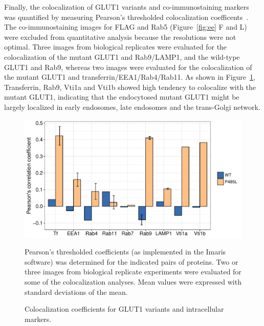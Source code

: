 Finally, the colocalization of GLUT1 variants and co-immunostaining markers was quantified by 
measuring Pearson's thresholded colocalization coefficents~\cite{Costes}. The co-immunostaining images for FLAG and Rab5 (Figure~\ref{fig:ee} F and L) were excluded from quantitative analysis because the resolutions were not optimal. Three images from biological replicates were evaluated for the colocalization of the mutant GLUT1 and Rab9/LAMP1, and the wild-type GLUT1 and Rab9, whereas two images were evaluated for the colocalization of the mutant GLUT1 and transferrin/EEA1/Rab4/Rab11. As shown in Figure~\ref{fig:coloc}, Transferrin, Rab9, Vti1a and Vti1b showed high tendency to colocalize with the mutant GLUT1, indicating that the endocytosed mutant GLUT1 might be largely localized in early endosomes, late endosomes and the trans-Golgi network.
\begin{figure}[h]
\centering
\includegraphics[scale=0.7]{Figures/coloc}
\caption{Colocalization coefficients for GLUT1 variants and intracellular markers.}
\vspace*{-3mm}
\small \justify
Pearson's thresholded coefficients (as implemented in the Imaris software) was determined for the indicated pairs of proteins. Two or three images from biological replicate experiments were evaluated for some of the colocalization analyses. Mean values were expressed with standard deviations of the mean.
\label{fig:coloc}
\end{figure}
